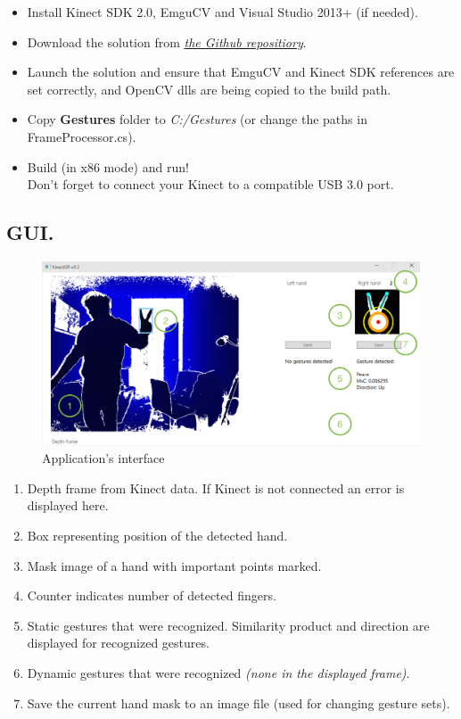 \documentclass[a4paper,11pt,oneside]{article}
\begin{document}
\begin{itemize}
\item Install Kinect SDK 2.0, EmguCV and Visual Studio 2013+ (if needed).
\item Download the solution from \href{https://github.com/dmitryfd/KinectGR}{\textit{the Github repositiory}}.
\item Launch the solution and ensure that EmguCV and Kinect SDK references are set correctly, and OpenCV dlls are being copied to the build path. 
\item Copy \textbf{Gestures} folder to \textit{C:/Gestures} (or change the paths in FrameProcessor.cs).
\item Build (in x86 mode) and run! \\Don't forget to connect your Kinect to a compatible USB 3.0 port.
\end{itemize}

\subsection{GUI.}

  \begin{figure}[H]
  \centering
  \includegraphics[scale=0.6]{app-gui.png}
\caption{Application's interface}
\end{figure}

\begin{enumerate}
\item Depth frame from Kinect data. If Kinect is not connected an error is displayed here.
\item Box representing position of the detected hand.
\item Mask image of a hand with important points marked.
\item Counter indicates number of detected fingers.
\item Static gestures that were recognized. Similarity product and direction are displayed for recognized gestures.
\item Dynamic gestures that were recognized \textit{(none in the displayed frame)}.
\item Save the current hand mask to an image file (used for changing gesture sets).
\end{enumerate}
\end{document}
